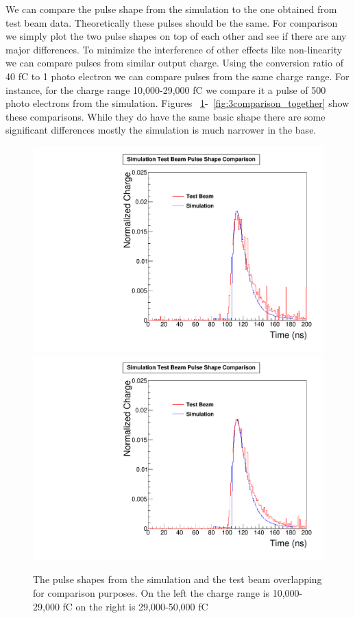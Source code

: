 We can compare the pulse shape from the simulation to the one obtained from test beam data. Theoretically these pulses should be the same. For comparison we simply plot the two pulse shapes on top of each other and see if there are any major differences. To minimize the interference of other effects like non-linearity we can compare pulses from similar output charge. Using the conversion ratio of 40 fC to 1 photo electron we can compare pulses from the same charge range. For instance, for the charge range 10,000-29,000 fC we compare it a pulse of 500 photo electrons from the simulation. Figures ~\ref{fig:1comparison_together}-~\ref{fig:3comparison_together} show these comparisons. While they do have the same basic shape there are some significant differences mostly the simulation is much narrower in the base.

\begin{figure}
\centering
\includegraphics[width=0.495\linewidth]{Figures/10Comparison.pdf}
\includegraphics[width=0.495\linewidth]{Figures/29Comparison.pdf}
\caption{The pulse shapes from the simulation and the test beam overlapping for comparison purposes. On the left the charge range is 10,000-29,000 fC on the right is 29,000-50,000 fC}
\label{fig:1comparison_together}
\end{figure}

